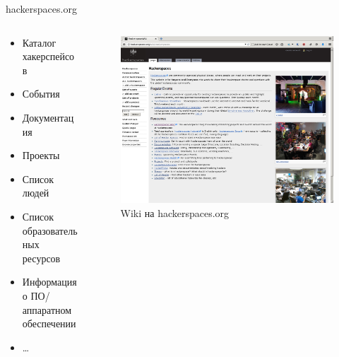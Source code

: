\documentclass[presentation]{beamer}
\begin{document}
\label{sec-1-3}
\begin{frame}[label=sec-1-3-3]{hackerspaces.org}
  \begin{columns}
    \begin{column}{0.4\textwidth}
      \begin{itemize}
      \item Каталог хакерспейсов
      \item События
      \item Документация
      \item Проекты
      \item Список людей
      \item Список образовательных ресурсов
      \item Информация о ПО/аппаратном обеспечении
      \item \ldots
      \end{itemize}
    \end{column}
    \begin{column}{0.6\textwidth}
    \begin{figure}[htb]
      \centering
      \includegraphics[width=.9\linewidth]{hackerspaces-org}
      \caption{\label{hackerspaces-org}Wiki на hackerspaces.org}
    \end{figure}
    \end{column}
  \end{columns}
\end{frame}
\end{document}
